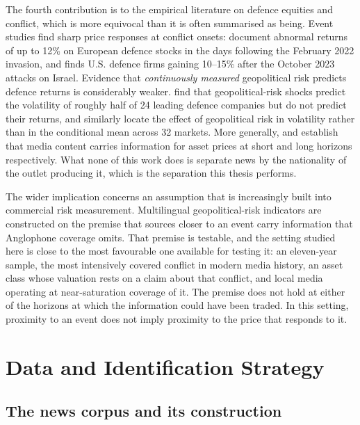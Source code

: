 \documentclass[12pt,a4paper]{article}
\begin{document}
The fourth contribution is to the empirical literature on defence equities and conflict, which is more equivocal than it is often summarised as being. Event studies find sharp price responses at conflict onsets: \citet{covachev2024europe} document abnormal returns of up to 12\% on European defence stocks in the days following the February 2022 invasion, and \citet{klomp2025hamas} finds U.S. defence firms gaining 10--15\% after the October 2023 attacks on Israel. Evidence that \textit{continuously measured} geopolitical risk predicts defence returns is considerably weaker. \citet{apergis2018defense} find that geopolitical-risk shocks predict the volatility of roughly half of 24 leading defence companies but do not predict their returns, and \citet{zhang2022race} similarly locate the effect of geopolitical risk in volatility rather than in the conditional mean across 32 markets. More generally, \citet{tetlock2007media} and \citet{manela2017} establish that media content carries information for asset prices at short and long horizons respectively. What none of this work does is separate news by the nationality of the outlet producing it, which is the separation this thesis performs.

The wider implication concerns an assumption that is increasingly built into commercial risk measurement. Multilingual geopolitical-risk indicators are constructed on the premise that sources closer to an event carry information that Anglophone coverage omits. That premise is testable, and the setting studied here is close to the most favourable one available for testing it: an eleven-year sample, the most intensively covered conflict in modern media history, an asset class whose valuation rests on a claim about that conflict, and local media operating at near-saturation coverage of it. The premise does not hold at either of the horizons at which the information could have been traded. In this setting, proximity to an event does not imply proximity to the price that responds to it.

\section{Data and Identification Strategy}
\label{sec:data}

\subsection{The news corpus and its construction}
\end{document}
